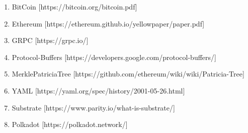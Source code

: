 \begin{enumerate}
\def\labelenumi{\arabic{enumi}.}
\tightlist
\item
  BitCoin {[}https://bitcoin.org/bitcoin.pdf{]}
\item
  Ethereum {[}https://ethereum.github.io/yellowpaper/paper.pdf{]}
\item
  GRPC {[}https://grpc.io/{]}
\item
  Protocol-Buffers {[}https://developers.google.com/protocol-buffers/{]}
\item
  MerklePatriciaTree
  {[}https://github.com/ethereum/wiki/wiki/Patricia-Tree{]}
\item
  YAML {[}https://yaml.org/spec/history/2001-05-26.html{]}
\item
  Substrate {[}https://www.parity.io/what-is-substrate/{]}
\item
  Polkadot {[}https://polkadot.network/{]}
\end{enumerate}
